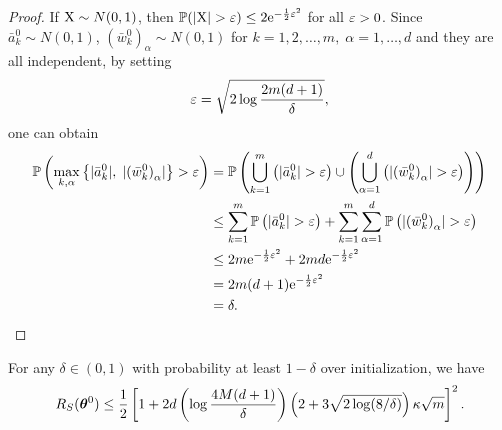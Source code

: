 \documentclass{article}
\begin{document}
\begin{proof}
    If $\textnormal{X} \sim N(0, 1)$, then $\mathbb{P}(\lvert\textnormal{X}\rvert > \varepsilon) \leq 2\mathrm{e}^{-\frac{1}{2}\varepsilon^2}$ for all $\varepsilon > 0$. Since $\bar{a}^0_k\sim N(0,1)$, ${(\bar{w}_k^0)}_{\alpha}\sim N(0,1)$ for $k=1, 2, \ldots, m,\; \alpha =1,\ldots,d$ and they are all independent, by setting
    \begin{equation}
        \varepsilon = \sqrt{2\log\frac{2m(d+1)}{\delta}},
    \end{equation}
    one can obtain
    \begin{equation}
        \begin{aligned}
            \mathbb{P}\left(\max\limits_{k,\alpha}\left\{\lvert\bar{a}_k^0\rvert,\; \lvert{(\bar{w}^0_k)}_{\alpha}\rvert\right \}>\varepsilon\right)
             & = \mathbb{P}\left(\bigcup\limits_{k=1}^m\left(\lvert\bar{a}_k^0\rvert>\varepsilon\right)\cup\left(\bigcup\limits_{\alpha=1}^d\left(\lvert{(\bar{w}_k^0)}_{\alpha}\rvert>\varepsilon\right)\right)\right) \\
             & \leq \sum_{k=1}^m \mathbb{P}\left(\lvert\bar{a}_k^0\rvert>\varepsilon\right) + \sum_{k=1}^m\sum_{\alpha=1}^d \mathbb{P}\left(\lvert{(\bar{w}^0_k)}_{\alpha}\rvert>\varepsilon\right)                          \\
             & \leq 2m \mathrm{e}^{-\frac{1}{2}\varepsilon^2} + 2md \mathrm{e}^{-\frac{1}{2}\varepsilon^2}                                                                                                             \\
             & = 2m(d+1)\mathrm{e}^{-\frac{1}{2}\varepsilon^2}                                                                                                                                          \\
             & = \delta.
        \end{aligned}
    \end{equation}
\end{proof}
\begin{lem}
    For any $\delta\in(0,1)$ with probability at least $1-\delta$ over initialization, we have
    \begin{equation}
        R_S(\bm{\theta}^0)\leq\frac{1}{2}\left[1 + 2d\left(\log\frac{4M(d+1)}{\delta}\right)\left(2+3\sqrt{2\log(8/\delta)}\right)\kappa\sqrt{m}\right]^2.
    \end{equation}
\end{lem}
\end{document}
